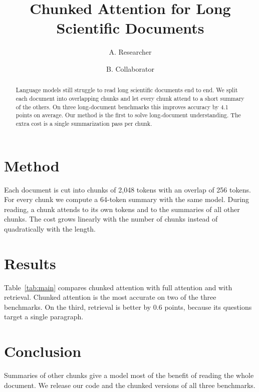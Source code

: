 \documentclass[11pt]{article}
\title{Chunked Attention for Long Scientific Documents}
\author{A. Researcher \and B. Collaborator}
\date{}
\begin{document}
\maketitle

\begin{abstract}
Language models still struggle to read long scientific documents end to end.
We split each document into overlapping chunks and let every chunk attend to a short summary of the others.
On three long-document benchmarks this improves accuracy by 4.1 points on average.
Our method is the first to solve long-document understanding.
The extra cost is a single summarization pass per chunk.
\end{abstract}



\section{Method}
Each document is cut into chunks of 2{,}048 tokens with an overlap of 256 tokens.
For every chunk we compute a 64-token summary with the same model.
During reading, a chunk attends to its own tokens and to the summaries of all other chunks.
The cost grows linearly with the number of chunks instead of quadratically with the length.

\section{Results}
Table~\ref{tab:main} compares chunked attention with full attention and with retrieval.
Chunked attention is the most accurate on two of the three benchmarks.
On the third, retrieval is better by 0.6 points, because its questions target a single paragraph.

\section{Conclusion}
Summaries of other chunks give a model most of the benefit of reading the whole document.
We release our code and the chunked versions of all three benchmarks.
\end{document}

